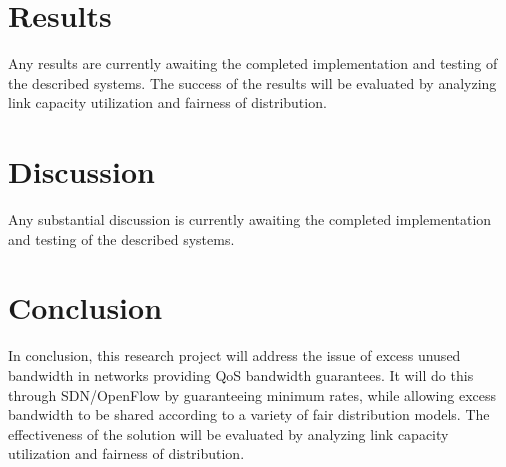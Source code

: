 \documentclass[accepted,single]{gipaper}
\begin{document}
\section{Results}
\label{results}

Any results are currently awaiting the completed implementation and testing of the described systems. The success of the results will be evaluated by analyzing link capacity utilization and fairness of distribution.

\section{Discussion}
\label{discussion}

Any substantial discussion is currently awaiting the completed implementation and testing of the described systems.

\section{Conclusion}
\label{conclusion}

In conclusion, this research project will address the issue of excess unused bandwidth in networks providing QoS bandwidth guarantees. It will do this through SDN/OpenFlow by guaranteeing minimum rates, while allowing excess bandwidth to be shared according to a variety of fair distribution models. The effectiveness of the solution will be evaluated by analyzing link capacity utilization and fairness of distribution.


\end{document}
